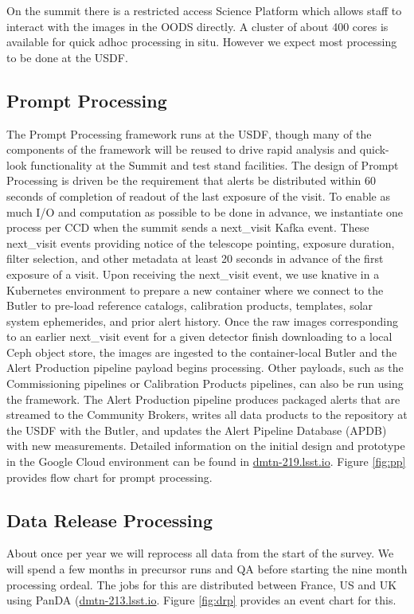 \documentclass[11pt,twoside]{article}
\begin{document}
On the summit there is a restricted access Science Platform which allows staff to interact with the  images in the OODS directly.
A cluster of about 400 cores is available for quick adhoc processing in situ.
However we expect most processing to be done at the USDF.

\subsection{Prompt Processing} \label{sec:prompt}
The Prompt Processing framework runs at the USDF, though many of the components of the framework will be reused to drive rapid analysis and quick-look functionality at the Summit and test stand facilities.
The design of Prompt Processing is driven be the requirement that alerts be distributed within 60 seconds of completion of readout of the last exposure of the visit.
To enable as much I/O and computation as possible to be done in advance, we instantiate one process per CCD when the summit sends a next\_visit Kafka event.
These next\_visit events providing notice of the telescope pointing, exposure duration, filter selection, and other metadata at least 20 seconds in advance of the first exposure of a visit.
Upon receiving the next\_visit event, we use knative in a Kubernetes environment to prepare a new container where we connect to the Butler to pre-load reference catalogs, calibration products, templates, solar system ephemerides, and prior alert history.
Once the raw images corresponding to an earlier next\_visit event for a given detector finish downloading to a local Ceph object store, the images are ingested to the container-local Butler and the Alert Production pipeline payload begins processing.
Other payloads, such as the Commissioning pipelines or Calibration Products pipelines, can also be run using the framework.
The Alert Production pipeline produces packaged alerts that are streamed to the Community Brokers, writes all data products to the repository at the USDF with the Butler, and updates the Alert Pipeline Database (APDB) with new measurements.
Detailed information on the initial design and prototype in the Google Cloud environment can be found in \url{dmtn-219.lsst.io}.
Figure \ref{fig:pp} provides flow chart for prompt processing.

\begin{centering}
\end{centering}

\subsection{Data Release Processing}\label{sec:DRP}
About once per year we will reprocess all data from the start of the survey.
We will spend a few months in precursor runs and QA before starting the nine month processing ordeal.
The jobs for this are distributed between France, US and UK using PanDA (\url{dmtn-213.lsst.io}.
Figure \ref{fig:drp} provides an event chart for this.
\end{document}

